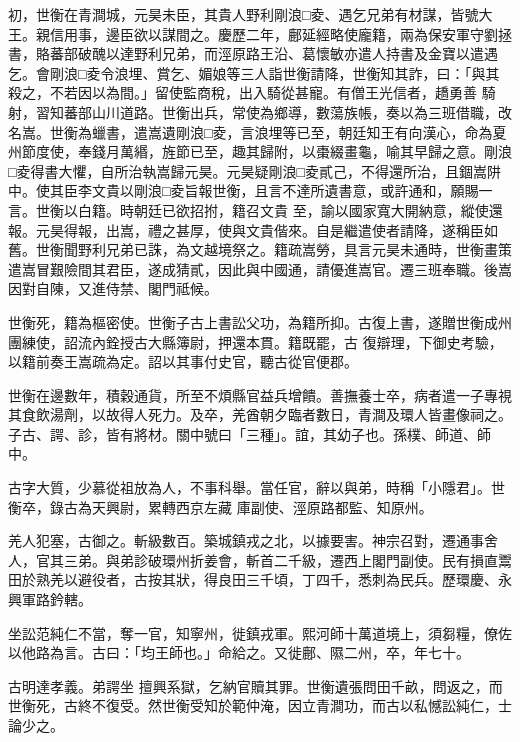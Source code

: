 \begin{pinyinscope}
 初，世衡在青澗城，元昊未臣，其貴人野利剛浪□夌、遇乞兄弟有材謀，皆號大王。親信用事，邊臣欲以謀間之。慶歷二年，鄜延經略使龐籍，兩為保安軍守劉拯書，賂蕃部破醜以達野利兄弟，而涇原路王沿、葛懷敏亦遣人持書及金寶以遣遇乞。會剛浪□夌令浪埋、賞乞、媚娘等三人詣世衡請降，世衡知其詐，曰：「與其殺之，不若因以為間。」留使監商稅，出入騎從甚寵。有僧王光信者，趫勇善
 騎射，習知蕃部山川道路。世衡出兵，常使為鄉導，數蕩族帳，奏以為三班借職，改名嵩。世衡為蠟書，遣嵩遺剛浪□夌，言浪埋等已至，朝廷知王有向漢心，命為夏州節度使，奉錢月萬緡，旌節已至，趣其歸附，以棗綴畫龜，喻其早歸之意。剛浪□夌得書大懼，自所治執嵩歸元昊。元昊疑剛浪□夌貳己，不得還所治，且錮嵩阱中。使其臣李文貴以剛浪□夌旨報世衡，且言不達所遺書意，或許通和，願賜一言。世衡以白籍。時朝廷已欲招拊，籍召文貴
 至，諭以國家寬大開納意，縱使還報。元昊得報，出嵩，禮之甚厚，使與文貴偕來。自是繼遣使者請降，遂稱臣如舊。世衡聞野利兄弟已誅，為文越境祭之。籍疏嵩勞，具言元昊未通時，世衡畫策遣嵩冒艱險間其君臣，遂成猜貳，因此與中國通，請優進嵩官。遷三班奉職。後嵩因對自陳，又進侍禁、閣門祗候。



 世衡死，籍為樞密使。世衡子古上書訟父功，為籍所抑。古復上書，遂贈世衡成州團練使，詔流內銓授古大縣簿尉，押還本貫。籍既罷，古
 復辯理，下御史考驗，以籍前奏王嵩疏為定。詔以其事付史官，聽古從官便郡。



 世衡在邊數年，積穀通貨，所至不煩縣官益兵增饋。善撫養士卒，病者遣一子專視其食飲湯劑，以故得人死力。及卒，羌酋朝夕臨者數日，青澗及環人皆畫像祠之。子古、諤、診，皆有將材。關中號曰「三種」。誼，其幼子也。孫樸、師道、師中。



 古字大質，少慕從祖放為人，不事科舉。當任官，辭以與弟，時稱「小隱君」。世衡卒，錄古為天興尉，累轉西京左藏
 庫副使、涇原路都監、知原州。



 羌人犯塞，古御之。斬級數百。築城鎮戎之北，以據要害。神宗召對，遷通事舍人，官其三弟。與弟診破環州折姜會，斬首二千級，遷西上閣門副使。民有損直鬻田於熟羌以避役者，古按其狀，得良田三千頃，丁四千，悉刺為民兵。歷環慶、永興軍路鈐轄。



 坐訟范純仁不當，奪一官，知寧州，徙鎮戎軍。熙河師十萬道境上，須芻糧，僚佐以他路為言。古曰：「均王師也。」命給之。又徙鄜、隰二州，卒，年七十。



 古明達孝義。弟諤坐
 擅興系獄，乞納官贖其罪。世衡遺張問田千畝，問返之，而世衡死，古終不復受。然世衡受知於範仲淹，因立青澗功，而古以私憾訟純仁，士論少之。




\end{pinyinscope}
